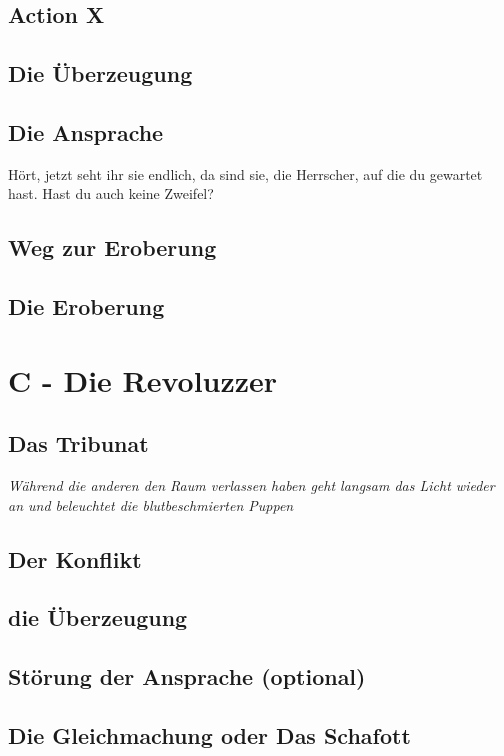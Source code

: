 \documentclass[a4paper, 12pt]{report}
\begin{document}
\subsection{Action X}

\subsection{Die Überzeugung}

\subsection{Die Ansprache}
Hört, jetzt seht ihr sie endlich, da sind sie, die Herrscher, auf die du gewartet hast.
Hast du auch keine Zweifel? 

\subsection{Weg zur Eroberung}

\subsection{Die Eroberung}

\section{C - Die Revoluzzer}

\subsection{Das Tribunat}
\textit{Während die anderen den Raum verlassen haben geht langsam das Licht wieder an und beleuchtet die blutbeschmierten Puppen}

\subsection{Der Konflikt}

\subsection{die Überzeugung}

\subsection{Störung der Ansprache (optional)}

\subsection{Die Gleichmachung oder Das Schafott}
\end{document}
